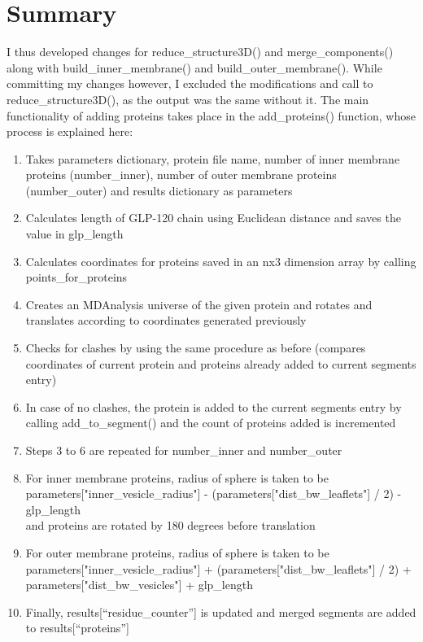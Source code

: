 \documentclass[12pt, a4paper]{report}
\begin{document}
\clearpage
\newpage 
\section*{Summary} 

I thus developed changes for reduce\_structure3D() and merge\_components() along with build\_inner\_membrane() and build\_outer\_membrane(). While committing my changes however, I excluded the modifications and call to reduce\_structure3D(), as the output was the same without it. The main functionality of adding proteins takes place in the add\_proteins() function, whose process is explained here: 

\begin{enumerate}
    \item Takes parameters dictionary, protein file name, number of inner membrane proteins (number\_inner), number of outer membrane proteins (number\_outer) and results dictionary as parameters 
    \item Calculates length of GLP-120 chain using Euclidean distance and saves the value in glp\_length 
    \item Calculates coordinates for proteins saved in an nx3 dimension array by calling points\_for\_proteins 
    \item Creates an MDAnalysis universe of the given protein and rotates and translates according to coordinates generated previously 
    \item Checks for clashes by using the same procedure as before (compares coordinates of current protein and proteins already added to current segments entry) 
    \item In case of no clashes, the protein is added to the current segments entry by calling add\_to\_segment() and the count of proteins added is incremented 
    \item Steps 3 to 6 are repeated for number\_inner and number\_outer 
    \item For inner membrane proteins, radius of sphere is taken to be 
    \\parameters["inner\_vesicle\_radius"] - (parameters["dist\_bw\_leaflets"] / 2) - glp\_length 
    \\and proteins are rotated by 180 degrees before translation 
    \item For outer membrane proteins, radius of sphere is taken to be 
    \\parameters["inner\_vesicle\_radius"] + (parameters["dist\_bw\_leaflets"] / 2) + parameters["dist\_bw\_vesicles"] + glp\_length 
    \item Finally, results[“residue\_counter”] is updated and merged segments are added to results[“proteins”] 
\end{enumerate}
\end{document}
